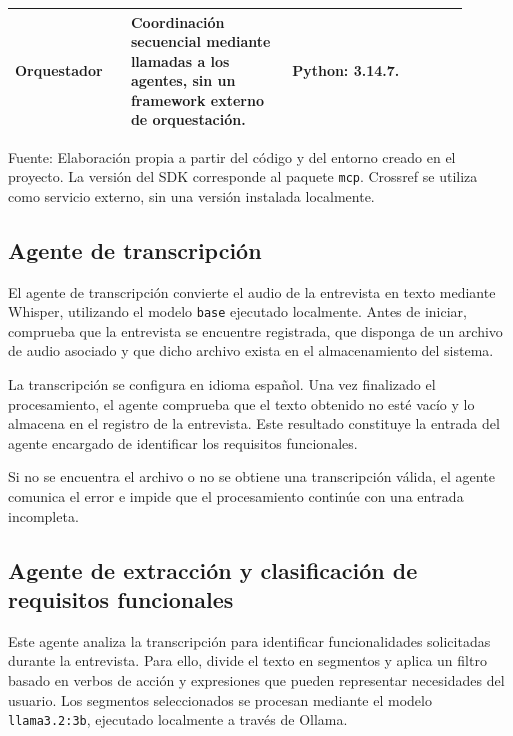 \begin{table}[H]
\begin{tabular}{
        |>{\raggedright\arraybackslash}p{0.23\linewidth}
        |>{\raggedright\arraybackslash}p{0.32\linewidth}
        |>{\raggedright\arraybackslash}p{0.35\linewidth}|
    }
        Orquestador &
        Coordinación secuencial mediante
        llamadas a los agentes, sin un
        framework externo de orquestación. &
        Python: 3.14.7. \\
        \hline
    \end{tabular}

    \par\smallskip
    \begin{minipage}{0.95\linewidth}
        \footnotesize
        Fuente: Elaboración propia a partir del código
        y del entorno creado en el proyecto. La versión del SDK
        corresponde al paquete \texttt{mcp}.
        Crossref se utiliza como servicio externo,
        sin una versión instalada localmente.
    \end{minipage}
    \endgroup
\end{table}

\subsection{Agente de transcripción}

El agente de transcripción convierte el audio de la entrevista
en texto mediante Whisper, utilizando el modelo
\texttt{base} ejecutado localmente. Antes de iniciar,
comprueba que la entrevista se encuentre registrada, que
disponga de un archivo de audio asociado y que dicho archivo
exista en el almacenamiento del sistema.

La transcripción se configura en idioma español. Una vez
finalizado el procesamiento, el agente comprueba que el texto
obtenido no esté vacío y lo almacena en el registro de la
entrevista. Este resultado constituye la entrada del agente
encargado de identificar los requisitos funcionales.

Si no se encuentra el archivo o no se obtiene una
transcripción válida, el agente comunica el error e impide
que el procesamiento continúe con una entrada incompleta.

\subsection{Agente de extracción y clasificación de requisitos funcionales}

Este agente analiza la transcripción para identificar
funcionalidades solicitadas durante la entrevista. Para
ello, divide el texto en segmentos y aplica un filtro
basado en verbos de acción y expresiones que pueden
representar necesidades del usuario. Los segmentos
seleccionados se procesan mediante el modelo
\texttt{llama3.2:3b}, ejecutado localmente a través de Ollama.

